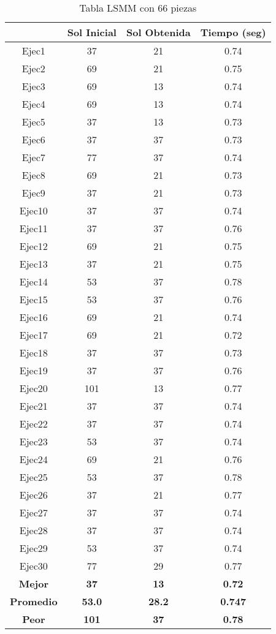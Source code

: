 
\begin{table}
\caption{Tabla LSMM con 66 piezas}
\centering
\begin{tabular}{|c|c|c|c|}
\hline
 & {\bf Sol Inicial} & {\bf Sol Obtenida} & {\bf Tiempo (seg)} \\
\hline
Ejec1 & 37 & 21  & 0.74 \\
\hline
Ejec2 & 69 & 21  & 0.75 \\
\hline
Ejec3 & 69 & 13  & 0.74 \\
\hline
Ejec4 & 69 & 13  & 0.74 \\
\hline
Ejec5 & 37 & 13  & 0.73 \\
\hline
Ejec6 & 37 & 37  & 0.73 \\
\hline
Ejec7 & 77 & 37  & 0.74 \\
\hline
Ejec8 & 69 & 21  & 0.73 \\
\hline
Ejec9 & 37 & 21  & 0.73 \\
\hline
Ejec10 & 37 & 37  & 0.74 \\
\hline
Ejec11 & 37 & 37  & 0.76 \\
\hline
Ejec12 & 69 & 21  & 0.75 \\
\hline
Ejec13 & 37 & 21  & 0.75 \\
\hline
Ejec14 & 53 & 37  & 0.78 \\
\hline
Ejec15 & 53 & 37  & 0.76 \\
\hline
Ejec16 & 69 & 21  & 0.74 \\
\hline
Ejec17 & 69 & 21  & 0.72 \\
\hline
Ejec18 & 37 & 37  & 0.73 \\
\hline
Ejec19 & 37 & 37  & 0.76 \\
\hline
Ejec20 & 101 & 13  & 0.77 \\
\hline
Ejec21 & 37 & 37  & 0.74 \\
\hline
Ejec22 & 37 & 37  & 0.74 \\
\hline
Ejec23 & 53 & 37  & 0.74 \\
\hline
Ejec24 & 69 & 21  & 0.76 \\
\hline
Ejec25 & 53 & 37  & 0.78 \\
\hline
Ejec26 & 37 & 21  & 0.77 \\
\hline
Ejec27 & 37 & 37  & 0.74 \\
\hline
Ejec28 & 37 & 37  & 0.74 \\
\hline
Ejec29 & 53 & 37  & 0.74 \\
\hline
Ejec30 & 77 & 29  & 0.77 \\
\hline
{\bf Mejor} & {\bf 37} & {\bf 13} & {\bf 0.72} \\
\hline
{\bf Promedio} & {\bf 53.0} & {\bf 28.2} & {\bf 0.747} \\
\hline
{\bf Peor} & {\bf 101} & {\bf 37} & {\bf 0.78} \\
\hline
\end{tabular}
\end{table}

